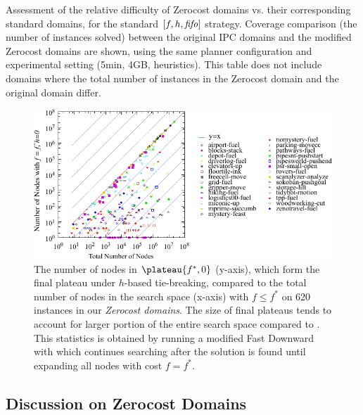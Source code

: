 
\begin{table}[htbp]
 \centering
 
 \caption{
 Assessment of the relative difficulty of Zerocost domains vs. their corresponding standard domains, for the standard $[f,h,{\text{\textit{fifo}}}]$ strategy.
 Coverage comparison (the number of instances solved) 
 between the original IPC domains and the modified Zerocost domains are shown, 
 using the same planner configuration and experimental setting (5min, 4GB, \lmcut heuristics).
 This table does not include domains where the total number of instances
 in the Zerocost domain  and the original domain differ. 
 }
 \label{tbl:lmcut-zerocost-std}
\end{table}

\begin{figure}[htbp]
  \centering
  \includegraphics{tables/aaai16-frontier/zerocost/lmcut_frontier-front.pdf}
  \caption{
 The number of nodes in $\plateau{f^*, 0}$ (y-axis), which form
  the final plateau under $h$-based tie-breaking, compared to
 the total number of nodes in the search space (x-axis) with
 $f\leq f^*$ on 620 instances in our \emph{Zerocost domains}.
 The size of final plateaus tends to account for larger portion of the
 entire search space compared to .
 This statistics is obtained by running a modified Fast Downward with
 \lmcut which continues searching after the solution is found
 until expanding all nodes with cost $f=f^*$.
 }
 \label{fig:plateau-zerocost}
\end{figure}

\subsection{Discussion on Zerocost Domains}

